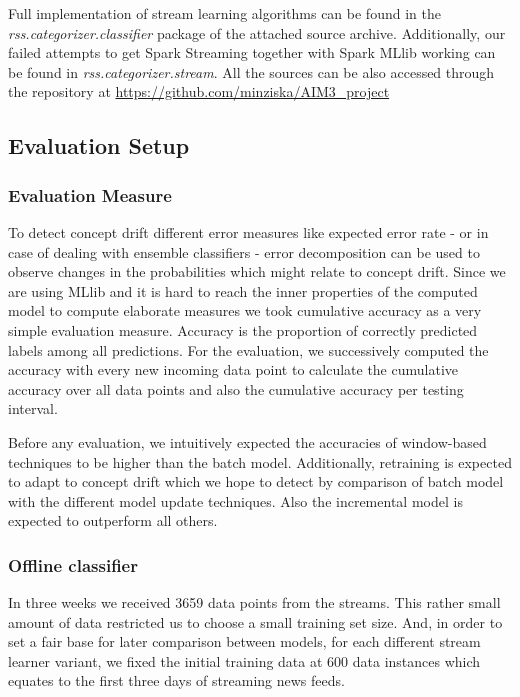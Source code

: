\documentclass{article} %
\begin{document}
Full implementation of stream learning algorithms can be found in the \textit{rss.categorizer.classifier} package of the attached source archive. Additionally, our failed attempts to get Spark Streaming together with Spark MLlib working can be found in \textit{ rss.categorizer.stream}. All the sources can be also accessed through the repository at \url{https://github.com/minziska/AIM3_project}

\subsection{Evaluation Setup}


\subsubsection*{Evaluation Measure}

To detect concept drift different error measures like expected error rate - or in case of dealing with ensemble classifiers - error decomposition can be used to observe changes in the probabilities which might relate to concept drift.\cite{Gao07ageneral}  Since we are using MLlib and it is hard to reach the inner properties of the computed model to compute elaborate measures we took cumulative accuracy as a very simple evaluation measure.  Accuracy is the  proportion of correctly predicted labels among all predictions. For the evaluation, we successively computed the accuracy with every new incoming data point to calculate the cumulative accuracy over all data points and also the cumulative accuracy per testing interval.

Before any evaluation, we intuitively expected the accuracies of window-based techniques to be higher than the batch model. Additionally, retraining is expected to adapt to concept drift which we hope to detect by comparison of batch model with the different model update techniques. Also the incremental model is expected to outperform all others.

\subsubsection*{Offline classifier}
In three weeks we received 3659 data points from the streams. This rather small amount of data restricted us to choose a small training set size. And, in order to set a fair base for later comparison between models, for each different stream learner variant, we fixed the initial training data at 600 data instances which equates to the first three days of streaming news feeds. 
\end{document}
